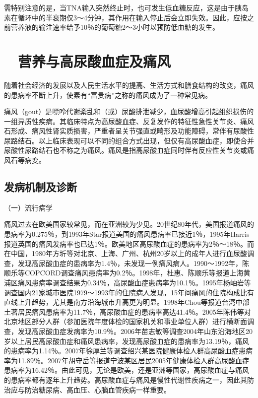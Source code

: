 需特别注意的是，当TNA输入突然终止时，也可发生低血糖反应，这是由于胰岛素在循环中的半衰期仅3～4分钟，其作用在输入停止后会立即失效。因此，应按之前营养液的输注速率给予10％的葡萄糖2～3小时以预防低血糖的发生。

\hypertarget{text00004.htmlux5cux23mllj25}{%
\section{　营养与高尿酸血症及痛风}\label{text00004.htmlux5cux23mllj25}}

随着社会经济的发展以及人民生活水平的提高、生活方式和膳食结构的改变，痛风的患病率不断上升，使素有“富贵病”之称的痛风成为了一种常见病。

痛风（gout）是嘌呤代谢紊乱和（或）尿酸排泄减少，血尿酸增高引起组织损伤的一组异质性疾病。其临床特点为高尿酸血症、反复发作的特征性急性关节炎、痛风石形成、痛风性肾实质损害，严重者呈关节强直或畸形及功能障碍，常伴有尿酸性尿路结石。以上临床表现可以不同的组合方式出现，但仅有高尿酸血症，即使合并尿酸性尿路结石也不称之为痛风。痛风是指高尿酸血症同时伴有反应性关节炎或痛风石等病变。

\hypertarget{text00004.htmlux5cux23mllj26}{%
\subsection{发病机制及诊断}\label{text00004.htmlux5cux23mllj26}}

（一）流行病学

痛风过去在欧美国家较常见，而在亚洲较为少见。20世纪80年代，美国报道痛风的患病率为0.275％，到1993年Star报道美国的痛风患病率已接近1％，1995年Harris报道英国的痛风发病率也已达1％。欧美地区高尿酸血症的患病率为2％～18％。而在中国，1980年方圻等对北京、上海、广州、杭州20岁以上的成年人进行血尿酸调查，发现高尿酸血症的患病率为1.4％，未发现一例痛风病人。1990～1992年，陈顺乐等COPCORD调查痛风患病率为0.2％。1998年，杜惠、陈顺乐等报道上海黄浦区痛风患病率调查结果为0.34％，高尿酸血症患病率为10.1％。1995年杨岫岩等调查国内21家城市医院1979～1993年的住院病人发现，15年间痛风的住院构成比有直线上升趋势，尤其是南方沿海城市升高更为明显。1998年Chou等报道台湾中部土著居民痛风患病率为11.7％，高尿酸血症的患病率高达41.4％。2005年陈伟等对北京地区部分人群（参加医院年度体检的国家机关和事业单位人群）进行横断面调查，发现高尿酸血症发病率为10.9％。2006年苗志敏等调查2004年山东沿海地区20岁以上居民高尿酸血症和痛风患病率，发现高尿酸血症的患病率为13.19％，痛风的患病率为1.14％。2007年徐厚兰等调查绍兴某医院健康体检人群高尿酸血症患病率为11.89％。2007年胡守岳等报道宁波某区居民2005年健康体检人群高尿酸血症患病率为16.42％。由此可见，无论是欧美，还是亚洲等国家，高尿酸血症与痛风的患病率都有逐年上升趋势。高尿酸血症与痛风是慢性代谢性疾病之一，因此其防治应与防治糖尿病、高血压、心脑血管疾病一样重要。

